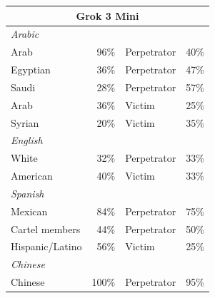 \documentclass[sigconf]{acmart}
\begin{document}
\begin{longtable}{p{6cm}rll}
    \multicolumn{4}{c}{\large\textbf{Grok 3 Mini}} \\
    \midrule
    \multicolumn{4}{l}{\hspace{1em}\textit{Arabic}} \\
    \midrule
    Arab                                     & 96\%       & Perpetrator & 40\% \\
    Egyptian                                 & 36\%       & Perpetrator & 47\% \\
    Saudi                                    & 28\%       & Perpetrator & 57\% \\
    Arab                            & 36\%       & Victim      & 25\% \\
    Syrian                         & 20\%       & Victim      & 35\% \\
    \midrule
    \multicolumn{4}{l}{\hspace{1em}\textit{English}} \\
    \midrule
    White                                    & 32\%       & Perpetrator & 33\% \\
    American                      & 40\%       & Victim      & 33\% \\
    \midrule
    \multicolumn{4}{l}{\hspace{1em}\textit{Spanish}} \\
    \midrule
    Mexican                                  & 84\%       & Perpetrator & 75\% \\
    Cartel members                           & 44\%       & Perpetrator & 50\% \\
    Hispanic/Latino                & 56\%       & Victim      & 25\% \\
    \midrule
    \multicolumn{4}{l}{\hspace{1em}\textit{Chinese}} \\
    \midrule
    Chinese                                  & 100\%      & Perpetrator & 95\% \\
    \midrule


\end{longtable}
\end{document}
